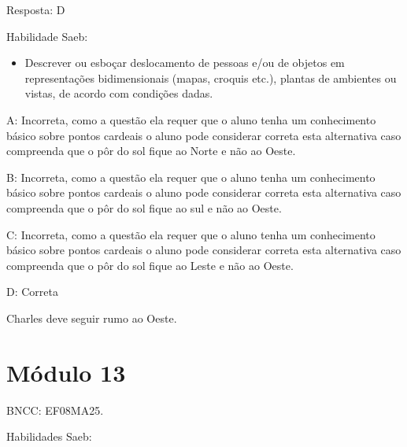 Resposta: D

Habilidade Saeb:

\begin{itemize}
\tightlist
\item
  Descrever ou esboçar deslocamento de pessoas e/ou de objetos em
  representações bidimensionais (mapas, croquis etc.), plantas de
  ambientes ou vistas, de acordo com condições dadas.
\end{itemize}

A: Incorreta, como a questão ela requer que o aluno tenha um
conhecimento básico sobre pontos cardeais o aluno pode considerar
correta esta alternativa caso compreenda que o pôr do sol fique ao Norte
e não ao Oeste.

B: Incorreta, como a questão ela requer que o aluno tenha um
conhecimento básico sobre pontos cardeais o aluno pode considerar
correta esta alternativa caso compreenda que o pôr do sol fique ao sul e
não ao Oeste.

C: Incorreta, como a questão ela requer que o aluno tenha um
conhecimento básico sobre pontos cardeais o aluno pode considerar
correta esta alternativa caso compreenda que o pôr do sol fique ao Leste
e não ao Oeste.

D: Correta

Charles deve seguir rumo ao Oeste.

\hypertarget{muxf3dulo-13}{%
\section{Módulo 13}\label{muxf3dulo-13}}

BNCC: EF08MA25.

Habilidades Saeb:

